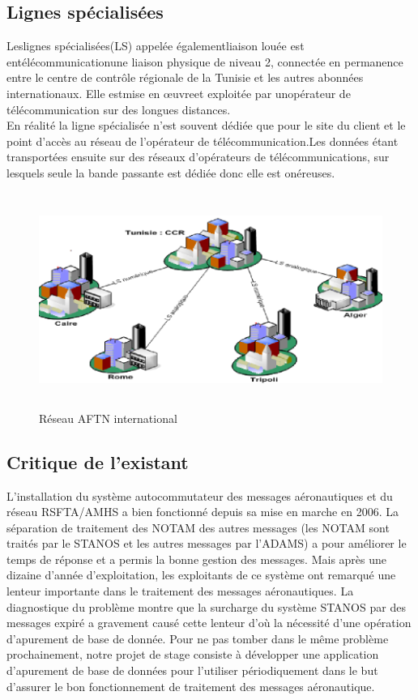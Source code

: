 \subsection{Lignes spécialisées}

Leslignes spécialisées(LS) appelée égalementliaison louée est entélécommunicationune liaison physique de niveau 2, connectée en permanence entre le centre de contrôle régionale de la Tunisie et les autres abonnées internationaux. Elle estmise en œuvreet exploitée par unopérateur de télécommunication sur des longues distances.\\
En réalité la ligne spécialisée n'est souvent dédiée que pour  le site du client et le point d'accès au réseau de l’opérateur de télécommunication.Les données étant transportées ensuite sur des réseaux d'opérateurs de télécommunications, sur lesquels seule la bande passante est dédiée donc elle est onéreuses.\\
\begin{figure}[!h]
\begin{center}
\includegraphics[width=13cm,height=7cm]{existant/ls.png}
\end{center}
\caption{Réseau AFTN international}
\end{figure}
\newpage
\subsection{Critique de l'existant}
L’installation du système autocommutateur des messages aéronautiques et du réseau RSFTA/AMHS a bien fonctionné depuis sa mise en marche en 2006. La séparation de traitement des NOTAM des autres messages (les NOTAM sont traités par le STANOS et les autres messages par l’ADAMS) a pour améliorer le temps de réponse et a permis la bonne gestion des messages. Mais après une dizaine d’année d’exploitation, les exploitants de ce système ont remarqué une lenteur importante dans le traitement des messages aéronautiques.  La diagnostique du problème montre que la surcharge du système STANOS par des messages expiré a gravement causé cette lenteur d’où la nécessité d’une opération d’apurement de base de donnée. Pour ne pas tomber dans le même problème prochainement, notre projet de stage consiste à développer une application d’apurement de base de données pour l’utiliser périodiquement dans le but d’assurer le bon fonctionnement de traitement des messages aéronautique.\\
